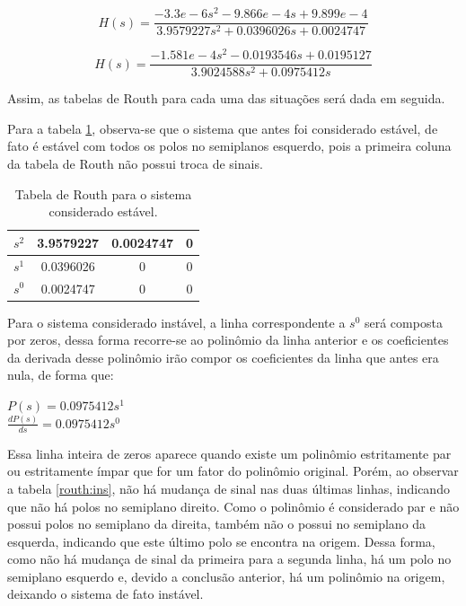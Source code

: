 \begin{equation} \label{routh:est}
    H(s) = \frac{-3.3e-6 s^2 - 9.866e-4 s + 9.899e-4}{3.9579227s^2 + 0.0396026s + 0.0024747}
\end{equation}

\begin{equation} \label{routh:ins}
    H(s) = \frac{-1.581e-4s^2 - 0.0193546s + 0.0195127}{3.9024588s^2 + 0.0975412s}
\end{equation}

Assim, as tabelas de Routh para cada uma das situações será dada em seguida.

Para a tabela \ref{table:routh:est}, observa-se que o sistema que antes foi considerado estável, de fato é estável com todos os polos no semiplanos esquerdo, pois a primeira coluna da tabela de Routh não possui troca de sinais.

\begin{table}[h]
\centering
\caption{Tabela de Routh para o sistema considerado estável.}\label{table:routh:est}
\begin{tabular}{l|ccc}
 $s^2$ & 3.9579227 & 0.0024747 & 0 \\ \hline
 $s^1$ & 0.0396026 & 0 & 0 \\ \hline
 $s^0$ & 0.0024747 & 0 & 0 \\ \hline
\end{tabular}
\end{table}

Para o sistema considerado instável, a linha correspondente a $s^0$ será composta por zeros, dessa forma recorre-se ao polinômio da linha anterior e os coeficientes da derivada desse polinômio irão compor os coeficientes da linha que antes era nula, de forma que:

\begin{center}
    $P(s) = 0.0975412s^1$\vspace{4pt}\\
    $\frac{dP(s)}{ds} = 0.0975412s^0$
\end{center}

Essa linha inteira de zeros aparece quando existe um polinômio estritamente par ou estritamente ímpar que for um fator do polinômio original. Porém, ao observar a tabela \ref{routh:ins}, não há mudança de sinal nas duas últimas linhas, indicando que não há polos no semiplano direito. Como o polinômio é considerado par e não possui polos no semiplano da direita, também não o possui no semiplano da esquerda, indicando que este último polo se encontra na origem. Dessa forma, como não há mudança de sinal da primeira para a segunda linha, há um polo no semiplano esquerdo e, devido a conclusão anterior, há um polinômio na origem, deixando o sistema de fato instável.

